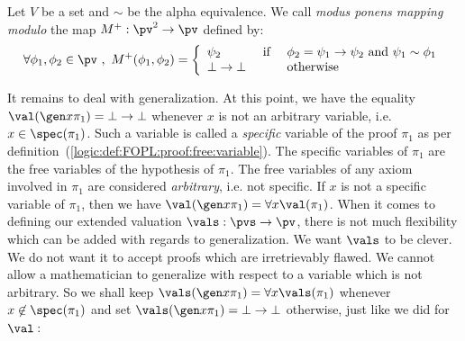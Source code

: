 \begin{defin}\label{logic:def:FUAP:valuationmod:mp:modulo}
Let $V$ be a set and $\sim$ be the alpha equivalence. We call
{\em modus ponens mapping modulo} the map $M^{+}:\pv^{2}\rightarrow
\pv$ defined by:
    \[
    \forall \phi_{1},\phi_{2}\in\pv\ ,\
    M^{+}(\phi_{1},\phi_{2})=\left\{
        \begin{array}{lcl}
        \psi_{2}&\mbox{\ if\ }&\phi_{2}=\psi_{1}\to\psi_{2}
        \mbox{\ and\ } \psi_{1}\sim\phi_{1}\\
        \bot\to\bot&\mbox{\ \ }&\mbox{otherwise}\\
        \end{array}
    \right.
    \]
\end{defin}

It remains to deal with generalization. At this point, we have the
equality $\val(\gen x\pi_{1})=\bot\to\bot$ whenever $x$ is not an
arbitrary variable, i.e. $x\in\spec(\pi_{1})$. Such a variable is
called a {\em specific} variable of the proof $\pi_{1}$ as per
definition~(\ref{logic:def:FOPL:proof:free:variable}). The specific
variables of $\pi_{1}$ are the free variables of the hypothesis of
$\pi_{1}$. The free variables of any axiom involved in $\pi_{1}$ are
considered {\em arbitrary}, i.e. not specific. If $x$ is not a
specific variable of $\pi_{1}$, then we have $\val(\gen
x\pi_{1})=\forall x\val(\pi_{1})$. When it comes to defining our
extended valuation $\vals:\pvs\to\pv$, there is not much flexibility
which can be added with regards to generalization. We want $\vals$
to be clever. We do not want it to accept proofs which are
irretrievably flawed. We cannot allow a mathematician to generalize
with respect to a variable which is not arbitrary. So we shall keep
$\vals(\gen x\pi_{1})=\forall x\vals(\pi_{1})$ whenever
$x\not\in\spec(\pi_{1})$ and set $\vals(\gen x\pi_{1})=\bot\to\bot$
otherwise, just like we did for $\val$\,:

